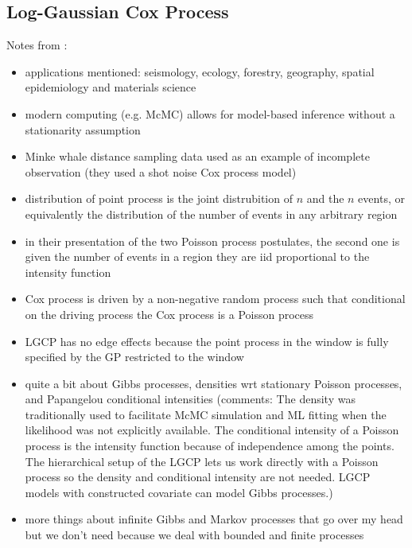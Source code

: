 \documentclass[]{interact}
\begin{document}
\subsection{Log-Gaussian Cox Process}

Notes from \cite{moellerwaagepetersen}:

\begin{itemize}

\item applications mentioned: seismology, ecology, forestry, geography, spatial
epidemiology and materials science

\item modern computing (e.g. McMC) allows for model-based inference without a
stationarity assumption

\item Minke whale distance sampling data used as an example of incomplete
observation (they used a shot noise Cox process model)

\item distribution of point process is the joint distrubition of \(n\) and
the \(n\) events, or equivalently the distribution of the number of events in
any arbitrary region

\item in their presentation of the two Poisson process postulates, the second
one is given the number of events in a region they are iid proportional to the
intensity function

\item Cox process is driven by a non-negative random process such that
conditional on the driving process the Cox process is a Poisson process

\item LGCP has no edge effects because the point process in the window is
fully specified by the GP restricted to the window

\item quite a bit about Gibbs processes, densities wrt stationary Poisson
processes, and Papangelou conditional intensities (comments: The density was
traditionally used to facilitate McMC simulation and ML fitting when the
likelihood was not explicitly available. The conditional intensity of a
Poisson process is the intensity function because of independence among the
points. The hierarchical setup of the LGCP lets us work directly with a
Poisson process so the density and conditional intensity are not needed. LGCP
models with constructed covariate can model Gibbs processes.)

\item more things about infinite Gibbs and Markov processes that go over my
head but we don't need because we deal with bounded and finite processes

\end{itemize}
\end{document}
